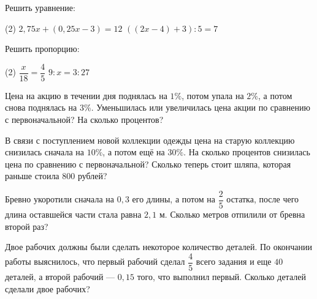 \begin{class}[number=4]
	\begin{listofex}
		\item Решить уравнение:
		\begin{tasks}(2)
			\task \( 2,75x+(0,25x-3)=12 \)
			\task \( ((2x-4)+3):5=7\)
		\end{tasks}
		\item Решить пропорцию:
		\begin{tasks}(2)
			\task \( \dfrac{x}{18}=\dfrac{4}{5} \)
			\task \( 9:x=3:27\)
		\end{tasks}
		\item Цена на акцию в течении дня поднялась на \(1\%\), потом упала на \(2\%\), а потом снова поднялась на \(3\%\). Уменьшилась или увеличилась цена акции по сравнению с первоначальной? На сколько процентов?
		\item В связи с поступлением новой коллекции одежды цена на старую коллекцию снизилась сначала на \(10\%\), а потом ещё на \(30\%\). На сколько процентов снизилась цена по сравнению с первоначальной? Сколько теперь стоит шляпа, которая раньше стоила \(800\) рублей?
		\item Бревно укоротили сначала на \(0,3\) его длины, а потом на \(\dfrac{2}{5}\) остатка, после чего длина оставшейся части стала равна \(2,1\) м. Сколько метров отпилили от бревна второй раз?
		\item Двое рабочих должны были сделать некоторое количество деталей. По окончании работы выяснилось, что первый рабочий сделал \(\dfrac{4}{5}\) всего задания и еще \(40\) деталей, а второй рабочий --- \(0,15\) того, что выполнил первый. Сколько деталей сделали двое рабочих?
	\end{listofex}
\end{class}

